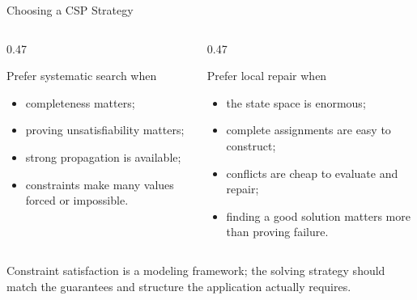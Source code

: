 \documentclass[aspectratio=169,10pt]{beamer}
\begin{document}
\begin{frame}[shrink=20]{Choosing a CSP Strategy}
  \begin{columns}[T,onlytextwidth]
    \begin{column}{0.47\textwidth}
      \begin{block}{Prefer systematic search when}
        \begin{itemize}
          \item completeness matters;
          \item proving unsatisfiability matters;
          \item strong propagation is available;
          \item constraints make many values forced or impossible.
        \end{itemize}
      \end{block}
    \end{column}

    \begin{column}{0.47\textwidth}
      \begin{block}{Prefer local repair when}
        \begin{itemize}
          \item the state space is enormous;
          \item complete assignments are easy to construct;
          \item conflicts are cheap to evaluate and repair;
          \item finding a good solution matters more than proving failure.
        \end{itemize}
      \end{block}
    \end{column}
  \end{columns}

  \begin{keyidea}
    Constraint satisfaction is a modeling framework; the solving strategy should match the guarantees and structure the application actually requires.
  \end{keyidea}
\end{frame}
\end{document}
